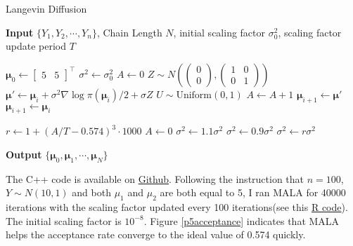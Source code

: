 \documentclass[12pt]{article}
\begin{document}
\begin{algorithm}
	\caption{Langevin Diffusion}\label{langevin}
	\hspace*{\algorithmicindent} \textbf{Input}  $\{Y_1, Y_2, \cdots, Y_n \}$, Chain Length $N$, initial scaling factor $\sigma_0^2$, scaling factor update period $T$ 
	\begin{algorithmic}[1]
		\State $\bm{\mu}_0 \gets \begin{bmatrix}5 & 5\end{bmatrix}^\top$
		\State $\sigma^2 \gets \sigma_0^2$
		\State $A \gets 0$ 
		\State $Z\sim N\left(\begin{pmatrix}0 \\ 0\end{pmatrix}, \begin{pmatrix}1 & 0 \\ 0 & 1\end{pmatrix} \right)$
		\State $\bm{\mu}' \gets \bm{\mu}_i + \sigma^2 \nabla \log \pi(\bm{\mu}_i)/2 + \sigma Z$
		\State $U\sim \text{Uniform}(0, 1)$
		\State $A\gets A+1$
		\State $\bm{\mu}_{i+1}\gets \bm{\mu}'$
		\Else
		\State $\bm{\mu}_{i+1}\gets \bm{\mu}_{i}$
		\EndIf
		
		 
			\State $r\gets 1+(A/T - 0.574)^3 \cdot 1000$
			\State $A\gets 0$
				\State $\sigma^2 \gets 1.1\sigma^2$
				\State $\sigma^2 \gets 0.9\sigma^2$
			\Else
				\State $\sigma^2 \gets r \sigma^2$
			\EndIf
		\EndIf
		\EndFor
	\end{algorithmic}
	\hspace*{\algorithmicindent} \textbf{Output} $\{ \bm{\mu}_0, \bm{\mu}_1, \cdots, \bm{\mu}_N \}$
\end{algorithm}

The C++ code is available on \href{https://github.com/mkbwang/BIOSTAT882/blob/master/HW1/P5.cpp}{Github}. Following the instruction that $n=100$, $Y\sim N(10, 1)$ and both $\mu_1$ and $\mu_2$ are both equal to 5, I ran MALA for 40000 iterations with the scaling factor updated every 100 iterations(see this \href{https://github.com/mkbwang/BIOSTAT882/blob/master/HW1/P5.R}{R code}). The initial scaling factor is $10^{-8}$. Figure \ref{p5acceptance} indicates that MALA helps the acceptance rate converge to the ideal value of 0.574 quickly. 
\end{document}
